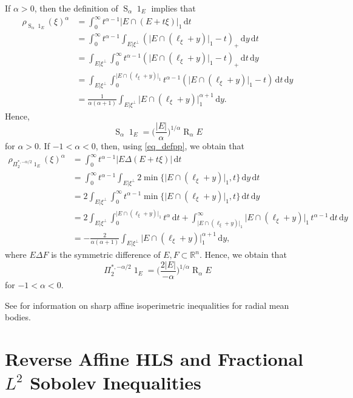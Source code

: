 \documentclass{amsart}
\newcommand{\omr}[1]{\operatorname{R}_{#1}\!}
\newcommand{\R}{\mathbb R}
\renewcommand{\d}{\,\mathrm{d}}
\newcommand{\vol}[1]{\vert #1\vert}
\newcommand{\pl}[1]{#1_{\scriptscriptstyle +}}
\renewcommand{\chi}{\operatorname{1}}
\newcommand{\hls}[1]{\operatorname{S}_{#1}\!} %
\begin{document}
If $\alpha > 0$, then the definition of $\hls \alpha \chi_E$ implies that 
\begin{align}
	\rho_{\hls \alpha \chi_E}(\xi)^\alpha
	&= \int_0^\infty t^{\alpha -1} \vol{E \cap (E+t\xi)}_1 \d t\\
	&= \int_0^\infty t^{\alpha -1} \int_{E\vert \xi^\perp} \pl{(\vol{E\cap(\ell_\xi+y)}_1-t)} \d y\d t\\
	&=\int_{E\vert \xi^\perp}  \int_0^\infty t^{\alpha -1} \pl{(\vol{E\cap(\ell_\xi+y)}_1-t)} \d t \d y\\
	&=  \int_{E\vert \xi^\perp} \int_0^{\vol{E\cap(\ell_\xi+y)}_1} t^{\alpha -1} (\vol{E\cap(\ell_\xi+y)}_1-t) \d t \d y\\
	&= \frac 1{\alpha(\alpha+1)} \int_{E\vert \xi^\perp}\vol{E\cap(\ell_\xi+y)}_1^{\alpha+1} \d y.
\end{align}
Hence, 
\begin{equation}\label{eq_gz_conn}
\hls \alpha \chi_E = \Big(\frac{\vol{E}}{\alpha}\Big)^{1/\alpha} \omr \alpha E
\end{equation}
for $\alpha>0$.
If $-1<\alpha< 0$, then, using \eqref{eq_defpp}, we obtain that
\begin{align}
	\rho_{\Pi_2^{\ast,-\alpha/2} \chi_E}(\xi)^\alpha
	&= \int_0^\infty t^{\alpha -1} \vol{E \Delta (E+t\xi)} \d t\\
	&= \int_0^\infty t^{\alpha -1} \int_{E\vert \xi^\perp} 2 \min\{\vol{E\cap(\ell_\xi+y)}_1,t\} \d y\d t\\
	&=2\int_{E\vert \xi^\perp}  \int_0^\infty t^{\alpha -1} \min\{\vol{E\cap(\ell_\xi+y)}_1,t\} \d t \d y\\
	&=  2\int_{E\vert \xi^\perp} \int_0^{\vol{E\cap(\ell_\xi+y)}_1} t^\alpha \d t + \int_{\vol{E\cap(\ell_\xi+y)}_1}^\infty \vol{E\cap(\ell_\xi+y)}_1\, t^{\alpha-1} \d t \d y\\
	&= -\frac 2{\alpha(\alpha+1)} \int_{E\vert \xi^\perp}\vol{E\cap(\ell_\xi+y)}_1^{\alpha+1} \d y,
\end{align}
where $E\Delta F$ is the symmetric difference of $E,F\subset\R^n$. Hence, we obtain that
\begin{equation}\label{eq_gz_conn_2}
\Pi_2^{\ast,-\alpha/2}  \chi_E = \Big(\frac{2\vol{E}}{-\alpha}\Big)^{1/\alpha} \omr \alpha E
\end{equation}
for $-1<\alpha< 0$.

\goodbreak
See \cite{GZ,HaddadLudwig_fracsob} for information on sharp affine isoperimetric inequalities for radial mean bodies.

\goodbreak
\section{Reverse Affine HLS and Fractional $L^2$ Sobolev Inequalities}\label{sec_reverse}
\end{document}
